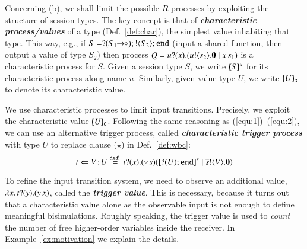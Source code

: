 \smallskip


Concerning (b), we shall limit the possible $R$ processes by
exploiting the structure of session types.
The key concept is that of {\bf \emph{characteristic process/values}}
of a type (Def.~\ref{def:char}),  
the 
simplest value inhabiting that type.
This way, e.g., if $S = ? (S_1\!\! \rightarrow\!\! \diamond) ; ! \langle S_2 \rangle ; \mathtt{end}$
(input a shared function, %
then output a value of type $S_2$)
then process $Q = u ? (x) . (u ! \langle s_2 \rangle . \mathbf{0} \;|\; x\, {s_1})$
is a characteristic process for $S$.
Given a session type $S$, we write $[\!\!(S)\!\!]^{u} $ for its characteristic process along name $u$.
Similarly, 
given value type $U$, we write 
$[\!\!(U)\!\!]_{\mathsf{c}}$ to denote its characteristic value.


We use characteristic processes to limit input transitions.
Precisely, we exploit  the
 characteristic value %
$[\!\!(U)\!\!]_{\mathsf{c}}$.
Following the same reasoning as (\ref{equ:1})--(\ref{equ:2}), 
we can use an alternative trigger process, called
{\bf\em characteristic trigger process} with type 
$U$ to replace clause
($\star$) in Def.~\ref{def:wbc}:
\begin{equation}
	\label{eq:4}
	\ftrigger{t}{V}{U} \defeq \fotrigger{t}{x}{s}{\btinp{U} \tinact}{V}
\end{equation}

\noi To refine the input transition system, we need to observe 
an additional value, 
$\lambda {x}.\,t ? (y) . (y\, {{x}})$, 
called the {\bf\em trigger value}. 
This is necessary, because it turns out
that a characteristic value 
alone as the observable input 
is not enough to define meaningful bisimulations.
Roughly speaking, the trigger value is used 
to {\em count} the number of free higher-order variables inside 
the receiver. In Example~\ref{ex:motivation} we explain the details. 

